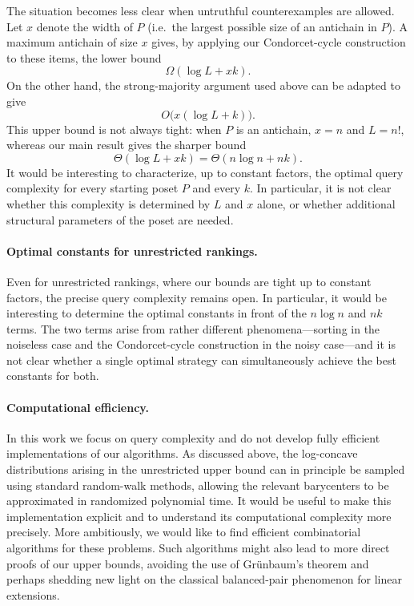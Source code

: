 \documentclass[11pt]{article}
\theoremstyle{definition}
\theoremstyle{remark}
\begin{document}
The situation becomes less clear when untruthful counterexamples are
allowed. Let $x$ denote the width of $P$ (i.e.\ the largest possible size of an antichain in $P$). A maximum antichain of size $x$
gives, by applying our Condorcet-cycle construction to these items, the
lower bound
\[
    \Omega(\log L+xk).
\]
On the other hand, the strong-majority argument used above can be adapted
to give
\[
    O\bigl(x(\log L+k)\bigr).
\]
This upper bound is not always tight: when $P$ is an antichain, $x=n$ and
$L=n!$, whereas our main result gives the sharper bound
\[
    \Theta(\log L+xk)
    =
    \Theta(n\log n+nk).
\]
It would be interesting to characterize, up to constant factors, the optimal
query complexity for every starting poset $P$ and every $k$. In particular,
it is not clear whether this complexity is determined by $L$ and $x$ alone,
or whether additional structural parameters of the poset are needed.

\paragraph{Optimal constants for unrestricted rankings.}
Even for unrestricted rankings, where our bounds are tight up to constant
factors, the precise query complexity remains open. In particular, it would
be interesting to determine the optimal constants in front of the
$n\log n$ and $nk$ terms. The two terms arise from rather different
phenomena---sorting in the noiseless case and the Condorcet-cycle
construction in the noisy case---and it is not clear whether a single
optimal strategy can simultaneously achieve the best constants for both.

\paragraph{Computational efficiency.}
In this work we focus on query complexity and do not develop fully efficient
implementations of our algorithms. As discussed above, the log-concave
distributions arising in the unrestricted upper bound can in principle be
sampled using standard random-walk methods, allowing the relevant
barycenters to be approximated in randomized polynomial time. It would be
useful to make this implementation explicit and to understand its
computational complexity more precisely. More ambitiously, we would like to
find efficient combinatorial algorithms for these problems. Such algorithms
might also lead to more direct proofs of our upper bounds, avoiding the use
of Gr\"unbaum's theorem and perhaps shedding new light on the classical
balanced-pair phenomenon for linear extensions.
\end{document}
